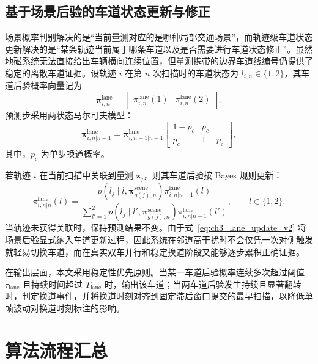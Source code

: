 \documentclass{xdupgthesis}
\begin{document}
\subsection{基于场景后验的车道状态更新与修正}

场景概率判别解决的是“当前量测对应的是哪种局部交通场景”，而轨迹级车道状态更新解决的是“某条轨迹当前属于哪条车道以及是否需要进行车道状态修正”。虽然地磁系统无法直接给出车辆横向连续位置，但量测携带的边界车道线编号仍提供了稳定的离散车道证据。设轨迹 $i$ 在第 $n$ 次扫描时的车道状态为 $l_{i,n}\in\{1,2\}$，其车道后验概率向量记为
\begin{equation}
	\boldsymbol\pi_{i,n}^{\mathrm{lane}}=
	\begin{bmatrix}
		\pi_{i,n}^{\mathrm{lane}}(1) &
		\pi_{i,n}^{\mathrm{lane}}(2)
	\end{bmatrix}.
	\label{eq:ch3_lane_vector_v2}
\end{equation}
预测步采用两状态马尔可夫模型：
\begin{equation}
	\boldsymbol\pi_{i,n|n-1}^{\mathrm{lane}}
	=
	\boldsymbol\pi_{i,n-1|n-1}^{\mathrm{lane}}
	\begin{bmatrix}
		1-p_c & p_c\\
		p_c & 1-p_c
	\end{bmatrix},
	\label{eq:ch3_lane_predict_v2}
\end{equation}
其中，$p_c$ 为单步换道概率。

若轨迹 $i$ 在当前扫描中关联到量测 $\mathbf z_j$，则其车道后验按 Bayes 规则更新：
\begin{equation}
	\pi_{i,n|n}^{\mathrm{lane}}(l)
	=
	\frac{p(l_j\mid l,\boldsymbol\pi_{g(j),n}^{\mathrm{scene}})\pi_{i,n|n-1}^{\mathrm{lane}}(l)}{\sum\limits_{l'=1}^{2}p(l_j\mid l',\boldsymbol\pi_{g(j),n}^{\mathrm{scene}})\pi_{i,n|n-1}^{\mathrm{lane}}(l')},
	\qquad l\in\{1,2\}.
	\label{eq:ch3_lane_update_v2}
\end{equation}
当轨迹未获得关联时，保持预测结果不变。由于式~\eqref{eq:ch3_lane_update_v2} 将场景后验显式纳入车道更新过程，因此系统在邻道高干扰时不会仅凭一次对侧触发就轻易切换车道，而在真实双车并行和稳定换道阶段又能够逐步累积正确证据。

在输出层面，本文采用稳定性优先原则。当某一车道后验概率连续多次超过阈值 $\tau_{\mathrm{lane}}$ 且持续时间超过 $T_{\mathrm{lane}}$ 时，输出该车道；当两车道后验发生持续且显著翻转时，判定换道事件，并将换道时刻对齐到固定滞后窗口提交的最早扫描，以降低单帧波动对换道时刻标注的影响。

\section{算法流程汇总}
\end{document}
